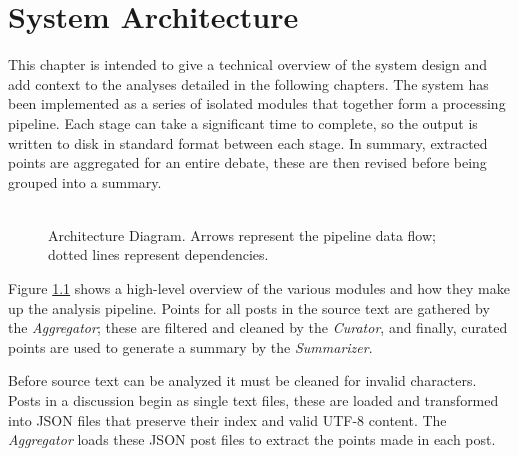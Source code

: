 \chapter{System Architecture\label{chap:system-architecture}}
  This chapter is intended to give a technical overview of the system design and add context to the analyses detailed in the following chapters. The system has been implemented as a series of isolated modules that together form a processing pipeline. Each stage can take a significant time to complete, so the output is written to disk in standard format between each stage. In summary, extracted points are aggregated for an entire debate, these are then revised before being grouped into a summary.

  \begin{figure}[!h]
    \centering
    \caption{\\Architecture Diagram. Arrows represent the pipeline data flow; dotted lines represent dependencies.}
    \label{fig:arch-dia}
  \end{figure}

  Figure \ref{fig:arch-dia} shows a high-level overview of the various modules and how they make up the analysis pipeline. Points for all posts in the source text are gathered by the \textit{Aggregator}; these are filtered and cleaned by the \textit{Curator}, and finally, curated points are used to generate a summary by the \textit{Summarizer}.

  Before source text can be analyzed it must be cleaned for invalid characters. Posts in a discussion begin as single text files, these are loaded and transformed into JSON files that preserve their index and valid UTF-8 content. The \textit{Aggregator} loads these JSON post files to extract the points made in each post.

